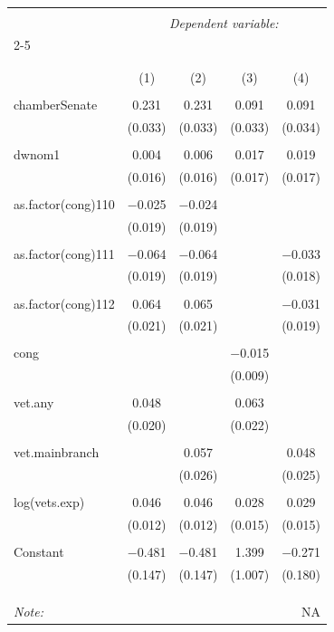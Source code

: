 
\begin{table}[!htbp] \centering 
  \caption{} 
  \label{} 
\begin{tabular}{@{\extracolsep{5pt}}lcccc} 
\\[-1.8ex]\hline 
\hline \\[-1.8ex] 
 & \multicolumn{4}{c}{\textit{Dependent variable:}} \\ 
\cline{2-5} 
\\[-1.8ex] & \multicolumn{4}{c}{ } \\ 
\\[-1.8ex] & (1) & (2) & (3) & (4)\\ 
\hline \\[-1.8ex] 
 chamberSenate & 0.231 & 0.231 & 0.091 & 0.091 \\ 
  & (0.033) & (0.033) & (0.033) & (0.034) \\ 
  & & & & \\ 
 dwnom1 & 0.004 & 0.006 & 0.017 & 0.019 \\ 
  & (0.016) & (0.016) & (0.017) & (0.017) \\ 
  & & & & \\ 
 as.factor(cong)110 & $-$0.025 & $-$0.024 &  &  \\ 
  & (0.019) & (0.019) &  &  \\ 
  & & & & \\ 
 as.factor(cong)111 & $-$0.064 & $-$0.064 &  & $-$0.033 \\ 
  & (0.019) & (0.019) &  & (0.018) \\ 
  & & & & \\ 
 as.factor(cong)112 & 0.064 & 0.065 &  & $-$0.031 \\ 
  & (0.021) & (0.021) &  & (0.019) \\ 
  & & & & \\ 
 cong &  &  & $-$0.015 &  \\ 
  &  &  & (0.009) &  \\ 
  & & & & \\ 
 vet.any & 0.048 &  & 0.063 &  \\ 
  & (0.020) &  & (0.022) &  \\ 
  & & & & \\ 
 vet.mainbranch &  & 0.057 &  & 0.048 \\ 
  &  & (0.026) &  & (0.025) \\ 
  & & & & \\ 
 log(vets.exp) & 0.046 & 0.046 & 0.028 & 0.029 \\ 
  & (0.012) & (0.012) & (0.015) & (0.015) \\ 
  & & & & \\ 
 Constant & $-$0.481 & $-$0.481 & 1.399 & $-$0.271 \\ 
  & (0.147) & (0.147) & (1.007) & (0.180) \\ 
  & & & & \\ 
\hline \\[-1.8ex] 
\hline 
\hline \\[-1.8ex] 
\textit{Note:}  & \multicolumn{4}{r}{NA} \\ 
\end{tabular} 
\end{table} 
